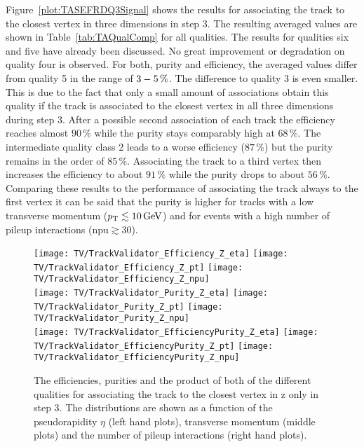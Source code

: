 Figure~\ref{plot:TASEFRDQ3Signal} shows the results for associating the track to the closest vertex in three dimensions in step 3. The resulting averaged values are shown in Table~\ref{tab:TAQualComp} for all qualities. The results for qualities six and five have already been discussed. No great improvement or degradation on quality four is observed. For both, purity and efficiency, the averaged values differ from quality 5 in the range of $3\--{}5\,\%$. The difference to quality 3 is even smaller. This is due to the fact that only a small amount of associations obtain this quality if the track is associated to the closest vertex in all three dimensions during step 3. After a possible second association of each track the efficiency reaches almost $90\,\%$ while the purity stays comparably high at $68\,\%$. The intermediate quality class 2 leads to a worse efficiency ($87\,\%$) but the purity remains in the order of $85\,\%$. Associating the track to a third vertex then increases the efficiency to about $91\,\%$ while the purity drops to about $56\,\%$. Comparing these results to the performance of associating the track always to the first vertex it can be said that the purity is higher for tracks with a low transverse momentum ($p_{\mathrm{T}}{}\lesssim10\,\text{Ge\hspace{-.08em}V}$) and for events with a high number of pileup interactions ($\textrm{npu}\gtrsim30$).

\begin{figure}[Ht]
    \centering
    \texttt{[image: TV/TrackValidator\_Efficiency\_Z\_eta]}
    \texttt{[image: TV/TrackValidator\_Efficiency\_Z\_pt]}
    \texttt{[image: TV/TrackValidator\_Efficiency\_Z\_npu]}
    \\
    \texttt{[image: TV/TrackValidator\_Purity\_Z\_eta]}
    \texttt{[image: TV/TrackValidator\_Purity\_Z\_pt]}
    \texttt{[image: TV/TrackValidator\_Purity\_Z\_npu]}
    \\
    \texttt{[image: TV/TrackValidator\_EfficiencyPurity\_Z\_eta]}
    \texttt{[image: TV/TrackValidator\_EfficiencyPurity\_Z\_pt]}
    \texttt{[image: TV/TrackValidator\_EfficiencyPurity\_Z\_npu]}
    \caption[Efficiencies, purities and their product of the different qualities of the association map with associating the track to the closest vertex in z only in step 3]{The efficiencies, purities and the product of both of the different qualities for associating the track to the closest vertex in z only in step 3. The distributions are shown as a function of the pseudorapidity $\eta$ (left hand plots), transverse momentum (middle plots) and the number of pileup interactions (right hand plots). \label{plot:TASEFRDQZSignal}}
\end{figure}


